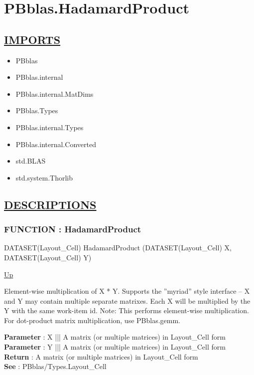 \chapter*{PBblas.HadamardProduct}
\hypertarget{ecldoc:toc:PBblas.HadamardProduct}{}

\section*{\underline{IMPORTS}}
\begin{itemize}
\item PBblas
\item PBblas.internal
\item PBblas.internal.MatDims
\item PBblas.Types
\item PBblas.internal.Types
\item PBblas.internal.Converted
\item std.BLAS
\item std.system.Thorlib
\end{itemize}

\section*{\underline{DESCRIPTIONS}}
\subsection*{FUNCTION : HadamardProduct}
\hypertarget{ecldoc:pbblas.hadamardproduct}{}
\begin{minipage}[t]{\textwidth}
\begin{flushleft}
DATASET(Layout\_Cell) HadamardProduct (DATASET(Layout\_Cell) X, DATASET(Layout\_Cell) Y)
\end{flushleft}
\end{minipage}
\hyperlink{ecldoc:toc:PBblas}{Up}

\par
Element-wise multiplication of X * Y. Supports the ''myriad'' style interface -- X and Y may contain multiple separate matrixes. Each X will be multiplied by the Y with the same work-item id. Note: This performs element-wise multiplication. For dot-product matrix multiplication, use PBblas.gemm.
\par
\textbf{Parameter} : X ||| A matrix (or multiple matrices) in Layout\_Cell form \\
\textbf{Parameter} : Y ||| A matrix (or multiple matrices) in Layout\_Cell form \\
\textbf{Return} : A matrix (or multiple matrices) in Layout\_Cell form \\
\textbf{See} : PBblas/Types.Layout\_Cell \\
